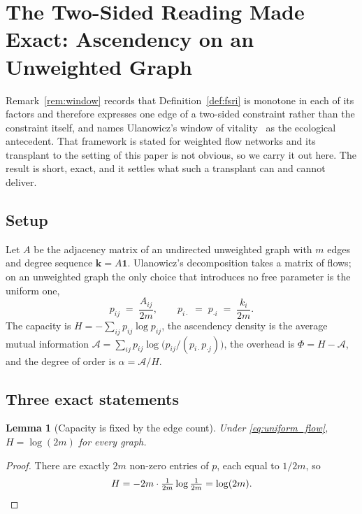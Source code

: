 \documentclass[11pt,a4paper]{article}
\newtheorem{lemma}{Lemma}
\begin{document}
\appendix
\section{The Two-Sided Reading Made Exact: Ascendency on an Unweighted Graph}
\label{app:ascendency}

Remark~\ref{rem:window} records that Definition~\ref{def:fsri} is monotone in
each of its factors and therefore expresses one edge of a two-sided constraint
rather than the constraint itself, and names Ulanowicz's window of
vitality~\cite{ulanowicz2009} as the ecological antecedent. That framework is
stated for weighted flow networks and its transplant to the setting of this
paper is not obvious, so we carry it out here. The result is short, exact, and
it settles what such a transplant can and cannot deliver.

\subsection{Setup}

Let $A$ be the adjacency matrix of an undirected unweighted graph with $m$
edges and degree sequence $\mathbf{k} = A\mathbf{1}$. Ulanowicz's decomposition
takes a matrix of flows; on an unweighted graph the only choice that introduces
no free parameter is the uniform one,
\begin{equation}
p_{ij} \;=\; \frac{A_{ij}}{2m},
\qquad p_{i\cdot} \;=\; p_{\cdot i} \;=\; \frac{k_i}{2m}.
\label{eq:uniform_flow}
\end{equation}
The capacity is $H = -\sum_{ij} p_{ij}\log p_{ij}$, the ascendency density is
the average mutual information $\mathcal{A} = \sum_{ij} p_{ij}\log\!\big(p_{ij}
/ (p_{i\cdot}p_{\cdot j})\big)$, the overhead is $\Phi = H - \mathcal{A}$, and
the degree of order is $\alpha = \mathcal{A}/H$.

\subsection{Three exact statements}

\begin{lemma}[Capacity is fixed by the edge count]
\label{lem:capacity}
Under \eqref{eq:uniform_flow}, $H = \log(2m)$ for every graph.
\end{lemma}

\begin{proof}
There are exactly $2m$ non-zero entries of $p$, each equal to $1/2m$, so
\[
H = -2m \cdot \tfrac{1}{2m}\log\tfrac{1}{2m} = \log(2m). \qedhere
\]
\end{proof}
\end{document}
